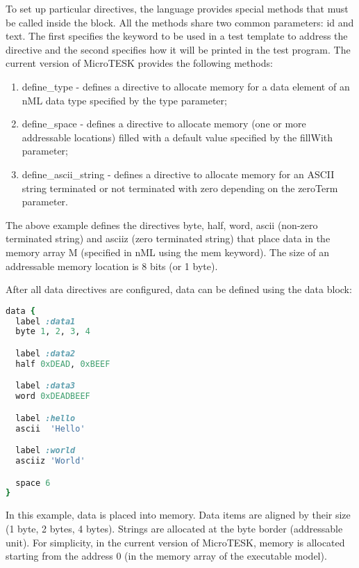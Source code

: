 \documentclass[oneside,final,14pt]{extreport}
\begin{document}
To set up particular directives, the language provides special methods that must
be called inside the block. All the methods share two common parameters: id and text.
The first specifies the keyword to be used in a test template to address the
directive and the second specifies how it will be printed in the test program. The
current version of MicroTESK provides the following methods:

\begin{enumerate}
  \item define{\_}type - defines a directive to allocate memory for a data element
        of an nML data type specified by the type parameter;

  \item define{\_}space - defines a directive to allocate memory (one or more
        addressable locations) filled with a default value specified by the
        fillWith parameter;

  \item define{\_}ascii{\_}string - defines a directive to allocate memory for an
        ASCII string terminated or not terminated with zero depending on the
        zeroTerm parameter.
\end{enumerate}

The above example defines the directives byte, half, word, ascii (non-zero terminated
string) and asciiz (zero terminated string) that place data in the memory array M
(specified in nML using the mem keyword). The size of an addressable memory location
is 8 bits (or 1 byte).

After all data directives are configured, data can be defined using the data block:

\begin{lstlisting}[language=ruby]
data {
  label :data1
  byte 1, 2, 3, 4

  label :data2
  half 0xDEAD, 0xBEEF

  label :data3
  word 0xDEADBEEF

  label :hello
  ascii  'Hello'

  label :world
  asciiz 'World'

  space 6
}
\end{lstlisting}

In this example, data is placed into memory. Data items are aligned by their size
(1 byte, 2 bytes, 4 bytes). Strings are allocated at the byte border (addressable
unit). For simplicity, in the current version of MicroTESK, memory is allocated
starting from the address 0 (in the memory array of the executable model).
\end{document}
